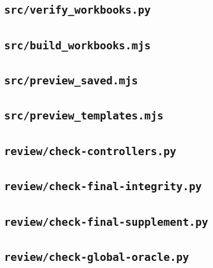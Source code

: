 \subsection*{\texttt{src/verify\_workbooks.py}}


\subsection*{\texttt{src/build\_workbooks.mjs}}


\subsection*{\texttt{src/preview\_saved.mjs}}


\subsection*{\texttt{src/preview\_templates.mjs}}


\subsection*{\texttt{review/check-controllers.py}}


\subsection*{\texttt{review/check-final-integrity.py}}


\subsection*{\texttt{review/check-final-supplement.py}}


\subsection*{\texttt{review/check-global-oracle.py}}


